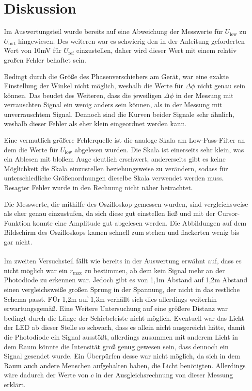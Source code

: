 \section{Diskussion}
\label{sec:Diskussion}
Im Auswertungsteil wurde bereits auf eine Abweichung der Messwerte für $U_\text{low}$ zu $U_\text{out}$ hingewiesen.
Des weiteren war es schwierig den in der Anleitung geforderten Wert von 10mV für $U_\text{ref}$ einzustellen, daher wird dieser Wert mit einem relativ großen Fehler behaftet sein.

Bedingt durch die Größe des Phasenverschiebers am Gerät, war eine exakte Einstellung der Winkel nicht möglich, weshalb die Werte für $\Delta\phi$ nicht genau sein können.
Das beudet des Weiteren, dass die jeweiligen $\Delta\phi$ in der Messung mit verrauschten Signal ein wenig anders sein können, als in der Messung mit unverrauschtem Signal.
Dennoch sind die Kurven beider Signale sehr ähnlich, weshalb dieser Fehler als eher klein eingeordnet werden kann.

Eine vermutlich größere Fehlerquelle ist die analoge Skala am Low-Pass-Filter an dem die Werte für $U_\text{low}$ abgelesen wurden. Die Skala ist einerseits sehr klein, was ein Ablesen mit bloßem Auge deutlich erschwert,
andererseits gibt es keine Möglichkeit die Skala einzustellen beziehungsweise zu verändern, sodass für unterschiedliche Größenordnungen dieselbe Skala verwendet werden muss. Besagter Fehler wurde in den Rechnung nicht näher betrachtet.

Die Messwerte, die mithilfe des Oszilloskop gemessen wurden, sind vergleichsweise als eher genau einzustufen, da sich diese gut einstellen ließ und mit der Cursor-Funktion konnte eine Amplitude gut abgelesen werden.
Die Abbildungen auf dem Bildschirm des Oszilloskops kamen schnell zum stehen und flackerten wenig bis gar nicht.
\\ \\
Im zweiten Versuchsteil fällt wie bereits in der Auswertung erwähnt auf, dass es nicht möglich war ein $r_\text{max}$ zu bestimmen, ab dem kein Signal mehr an der Photodiode zu erkennen war.
Jedoch gibt es von 1,1m Abstand auf 1,2m Abstand einen vergleichsweiße großen Sprung in der Spannung, der nicht in das restliche Schema passt.
FÜr 1,2m auf 1,3m verhällt sich dies allerdings weiterhin erwartungsgemäß. Eine Weitere Untersuchung auf eine größere Distanz war bedingt durch die Länge der Schiebeleiste nicht möglich.
Eventuell war das Licht der LED ab dieser Stelle so schwach, dass es allein nicht ausgereicht hätte, damit die Photodiode ein Signal ausstößt, allerdings zusammen mit anderem Licht in dem Raum könnte die Intensität groß genug gewesen sein, dass dennoch ein Signal gesendet wurde.
Ein Überpürfen desse war nicht möglich, da sich in dem Raum auch andere Menschen aufgehalten haben, die Licht benötigten.
Allerdings wäre dadurch der Werte von $c$ in der Ausgleichsrechnung von dieser Messung erklärt.